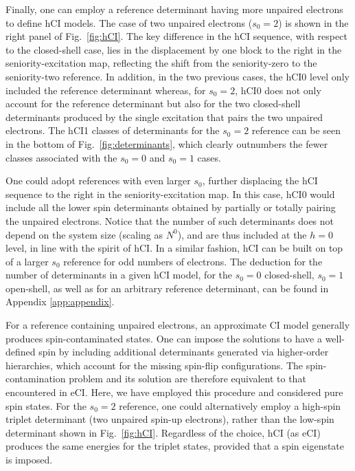 \documentclass[aip,jcp,reprint,noshowkeys,superscriptaddress]{revtex4-1}
\begin{document}
Finally, one can employ a reference determinant having more unpaired electrons to define hCI models.
The case of two unpaired electrons ($s_0=2$) is shown in the right panel of Fig.~\ref{fig:hCI}.
The key difference in the hCI sequence, with respect to the closed-shell case, lies in the displacement by one block to the right in the seniority-excitation map,
reflecting the shift from the seniority-zero to the seniority-two reference.
In addition, in the two previous cases, the hCI0 level only included the reference determinant
whereas, for $s_0=2$, hCI0 does not only account for the reference determinant
but also for the two closed-shell determinants produced by the single excitation that pairs the two unpaired electrons.
The hCI1 classes of determinants for the $s_0=2$ reference can be seen in the bottom of Fig.~\ref{fig:determinants},
which clearly outnumbers the fewer classes associated with the $s_0=0$ and $s_0=1$ cases.

One could adopt references with even larger $s_0$, further displacing the hCI sequence to the right in the seniority-excitation map.
In this case, hCI0 would include all the lower spin determinants obtained by partially or totally pairing the unpaired electrons.
Notice that the number of such determinants does not depend on the system size (scaling as $N^0$), and are thus included at the $h=0$ level, in line with the spirit of hCI.
In a similar fashion, hCI can be built on top of a larger $s_0$ reference for odd numbers of electrons.
The deduction for the number of determinants in a given hCI model, for the $s_0=0$ closed-shell, $s_0=1$ open-shell, as well as for an arbitrary reference determinant, can be found in Appendix \ref{app:appendix}.

For a reference containing unpaired electrons, an approximate CI model generally produces spin-contaminated states.
One can impose the solutions to have a well-defined spin by including additional determinants generated via higher-order hierarchies, which account for the missing spin-flip configurations. \cite{Chilkuri_2021}
The spin-contamination problem and its solution are therefore equivalent to that encountered in eCI. \cite{Maurice_1996}
Here, we have employed this procedure and considered pure spin states.
For the $s_0 = 2$ reference, one could alternatively employ a high-spin triplet determinant (two unpaired spin-up electrons), 
rather than the low-spin determinant shown in Fig.~\ref{fig:hCI}.
Regardless of the choice, hCI (as eCI) produces the same energies for the triplet states, provided that a spin eigenstate is imposed.
\end{document}

